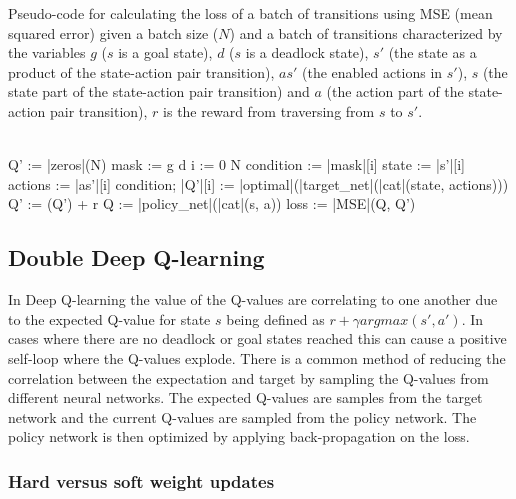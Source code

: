 \begin{algorithm}
    \caption{Pseudo-code for calculating the loss of a batch of transitions using MSE (mean squared error) given a batch size ($N$) and a batch of transitions characterized by the variables $g$ ($s$ is a goal state), $d$ ($s$ is a deadlock state), $s'$ (the state as a product of the state-action pair transition), $as'$ (the enabled actions in $s'$), $s$ (the state part of the state-action pair transition) and $a$ (the action part of the state-action pair transition), $r$ is the reward from traversing from $s$ to $s'$.}
    \label{algorithm:loss}
    \begin{program}
    \BEGIN \\ %
    Q' := |zeros|(N)
    mask := \lnot g \land \lnot d
    \FOR i := 0 \TO N  \DO
    condition := |mask|[i]
    state := |s'|[i]
    actions := |as'|[i]
    \IF condition; \DO |Q'|[i] := |optimal|(|target_net|(|cat|(state, actions))) \OD \OD \\ \OD
    Q' := (\gamma Q') + r
    Q := |policy_net|(|cat|(s, a))
    loss := |MSE|(Q, Q')
    \END
    \end{program}
\end{algorithm}

\subsection{Double Deep Q-learning}

In Deep Q-learning the value of the Q-values are correlating to one another due to the expected Q-value for state $s$ being defined as $r + \gamma argmax(s', a')$. In cases where there are no deadlock or goal states reached this can cause a positive self-loop where the Q-values explode. There is a common method of reducing the correlation between the expectation and target by sampling the Q-values from different neural networks. The expected Q-values are samples from the target network and the current Q-values are sampled from the policy network. The policy network is then optimized by applying back-propagation on the loss.

\subsubsection{Hard versus soft weight updates}

